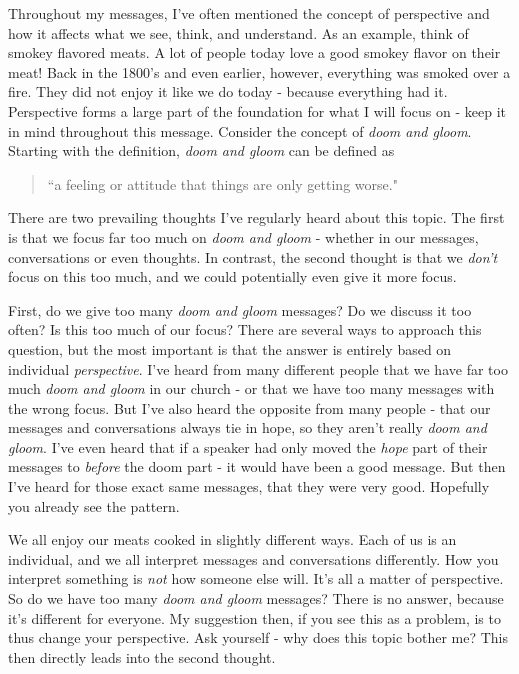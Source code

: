 \documentclass[10pt]{article}
\begin{document}
\begin{multicols}{2}

Throughout my messages, I've often mentioned the concept of perspective and how it affects what we see, think, and understand. As an example, think of smokey flavored meats. A lot of people today love a good smokey flavor on their meat! Back in the 1800's and even earlier, however, everything was smoked over a fire. They did not enjoy it like we do today - because everything had it. Perspective forms a large part of the foundation for what I will focus on - keep it in mind throughout this message. Consider the concept of \textit{doom and gloom}. Starting with the definition, \textit{doom and gloom} can be defined as 

\begin{quotation}
	``a feeling or attitude that things are only getting worse." \cite{Dictionary}
\end{quotation}

There are two prevailing thoughts I've regularly heard about this topic. The first is that we focus far too much on \textit{doom and gloom} - whether in our messages, conversations or even thoughts. In contrast, the second thought is that we \textit{don't} focus on this too much, and we could potentially even give it more focus.

First, do we give too many \textit{doom and gloom} messages? Do we discuss it too often? Is this too much of our focus? There are several ways to approach this question, but the most important is that the answer is entirely based on individual \textit{perspective}. I've heard from many different people that we have far too much \textit{doom and gloom} in our church - or that we have too many messages with the wrong focus. But I've also heard the opposite from many people - that our messages and conversations always tie in hope, so they aren't really \textit{doom and gloom}. I've even heard that if a speaker had only moved the \textit{hope} part of their messages to \textit{before} the doom part - it would have been a good message. But then I've heard for those exact same messages, that they were very good. Hopefully you already see the pattern. 

We all enjoy our meats cooked in slightly different ways. Each of us is an individual, and we all interpret messages and conversations differently. How you interpret something is \textit{not} how someone else will. It's all a matter of perspective. So do we have too many \textit{doom and gloom} messages? There is no answer, because it's different for everyone. My suggestion then, if you see this as a problem, is to thus change your perspective. Ask yourself - why does this topic bother me? This then directly leads into the second thought.


\end{multicols}
\end{document}
